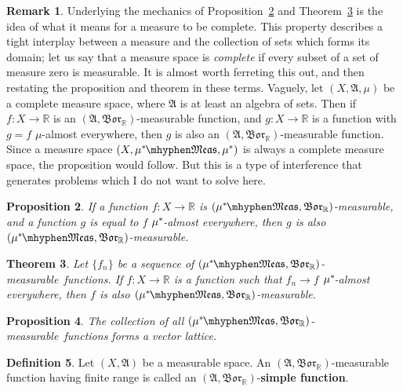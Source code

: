 \documentclass[
twoside=true,
paper=letter,
fontsize=9pt,
pagesize=auto,
leqno,
openany,
headsepline,
overfullrule,
]{scrbook}
\theoremstyle{plain}
\newtheorem{thm}{Theorem}[chapter]
\theoremstyle{plain}
\newtheorem{prop}[thm]{Proposition}
\theoremstyle{definition}
\newtheorem{defn}[thm]{Definition}
\newtheorem{rmk}[thm]{Remark}
\theoremstyle{bfnoteitalic}
\theoremstyle{bfnoteroman}
\newcommand{\term}[1]{\textbf{#1}\index{#1}}
\newcommand{\sigalg}[1]{\mathfrak{#1}}
\newcommand{\borel}{\mathfrak{Bor}}
\newcommand{\R}{\mathbb{R}}
\newcommand{\sigmaalgebra}{\sigalg{A}}
\newcommand{\measurable}[1]{{#1}\mhyphen\mathfrak{Meas}}
\newcommand{\kernast}{\ast\kern-1pt}
\newcommand{\mbmeasurable}{$(\measurable{\measure^\kernast},\borel_\R)$\hyp{}measurable}
\newcommand{\function}{f}
\newcommand{\functionii}{g}
\newcommand{\measurespace}{X}
\newcommand{\measure}{\mu}
\begin{document}
\begin{rmk}
Underlying the mechanics of Proposition~\ref{measurable_almost_everywhere} and Theorem~\ref{measurable_limits} is the idea of what it means for a measure to be complete. This property describes a tight interplay between a measure and the collection of sets which forms its domain; let us say that a measure space is \emph{complete} if every subset of a set of measure zero is measurable. It is almost worth ferreting this out, and then restating the proposition and theorem in these terms.   Vaguely, let $(\measurespace, \sigmaalgebra, \measure)$ be a complete measure space, where $\sigmaalgebra$ is at least an algebra of sets. Then if $f:\measurespace\to\R$ is an
$(\sigmaalgebra,\borel_\R)$\hyp{}measurable function, and $g:\measurespace\to\R$ is a function  with $g = f$ $\measure$\hyp{}almost everywhere, then $g$ is also an
$(\sigmaalgebra,\borel_\R)$\hyp{}measurable function. Since a measure space
$(\measurespace, \measurable{\measure^\kernast}, \measure^*)$ is always a complete measure space, the proposition would follow. But this is a type of interference that generates problems which I do not want to solve here.
\end{rmk}


\begin{prop}\label{measurable_almost_everywhere}
If a function $\function:\measurespace\to\R$ is \mbmeasurable, and 
a function $\functionii$ is equal to $\function$
$\measure^\kernast$-almost everywhere, then $\functionii$ is also \mbmeasurable. 
\end{prop}




\begin{thm}\label{measurable_limits}
Let $\{f_n\}$ be a sequence of \mbmeasurable\ functions. If $f:\measurespace\to\R$ is a function such that $f_n\to f$ $\measure^\kernast$-almost everywhere, then $f$ is also \mbmeasurable.
\end{thm}




\begin{prop}
The collection of all \mbmeasurable\ functions forms a vector lattice.
\end{prop}








\begin{defn}\label{simple_function}
Let $(\measurespace, \sigmaalgebra)$ be a measurable space.
An $(\sigmaalgebra, \borel_\R)$\hyp{}measurable function  having finite range is called an $(\sigmaalgebra, \borel_\R)$\hyp{}\term{simple function}.
\end{defn}
\end{document}
